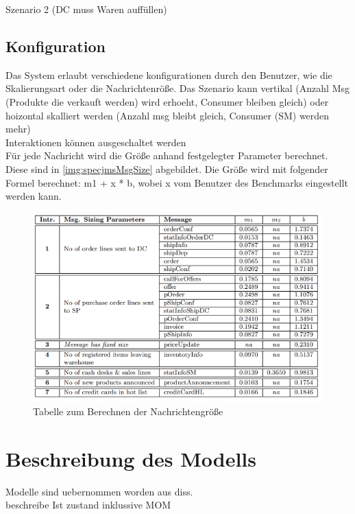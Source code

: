 Szenario 2 (DC muss Waren auffüllen)

\subsection{Konfiguration}
Das System erlaubt verschiedene konfigurationen durch den Benutzer, wie die Skalierungsart oder die Nachrichtenröße. Das Szenario kann vertikal (Anzahl Msg (Produkte die verkauft werden) wird erhoeht, Consumer bleiben gleich) oder
hoizontal skalliert werden (Anzahl msg bleibt gleich, Consumer (SM) werden mehr)\\
Interaktionen können ausgeschaltet werden \\

Für jede Nachricht wird die Größe anhand festgelegter Parameter berechnet. Diese sind in \autoref{img:specjmsMsgSize} abgebildet. Die Größe wird mit folgender Formel berechnet: m1 + x * b, wobei x vom Benutzer des Benchmarks eingestellt werden kann.

\begin{figure}
\center
  \includegraphics[width=1\textwidth]{images/specjmsmsgsize.png}
  \caption{Tabelle zum Berechnen der Nachrichtengröße}
  \label{img:specjmsMsgSize}
\end{figure}

\section{Beschreibung des Modells}
Modelle sind uebernommen worden aus diss. \\
beschreibe Ist zustand inklussive MOM
